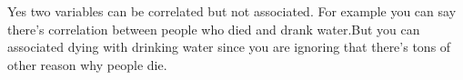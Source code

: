 \documentclass[12pt]{article}
\begin{document}
\begin{enumerate}

Yes two variables can be correlated but not associated. For example you can say there's correlation between people who died and drank water.But you can associated dying with drinking water since you are ignoring that there's tons of other reason why people die.  


\end{enumerate}
\end{document}
